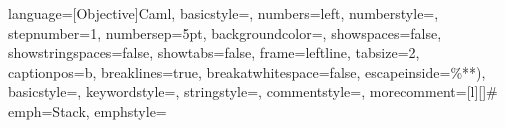         \usepackage[backend=bibtex]{biblatex}

\usepackage{fullpage}
\usepackage[english]{babel}
\usepackage[utf8]{inputenc}
\usepackage[T1]{fontenc}
\usepackage{lmodern}
\usepackage[onelanguage,boxed]{algorithm2e}
\usepackage{graphicx}
\usepackage{float}
\usepackage{amsmath}
\usepackage{amsfonts}
\usepackage{amsthm}
\usepackage{color}
\usepackage[usenames,dvipsnames]{xcolor}
\usepackage[toc,page]{appendix}
\usepackage{listings}
\usepackage{tikz}
\usepackage{subfigure}
\usepackage{wrapfig}
\usepackage{hyperref}
\hypersetup{colorlinks,linkcolor=black,urlcolor=blue}
\usepackage[font=small,labelfont=bf]{caption}
\newtheorem {myDef} {Definition}
\newtheorem {myTh}{Theorem}
\lstset
{
  language=[Objective]Caml,
  basicstyle=\footnotesize,       %
  numbers=left,                   %
  numberstyle=\footnotesize,      %
  stepnumber=1,                   %
  numbersep=5pt,                  %
  backgroundcolor=\color{white},  %
  showspaces=false,               %
  showstringspaces=false,         %
  showtabs=false,                 %
  frame=leftline,           %
  tabsize=2,          %
  captionpos=b,           %
  breaklines=true,        %
  breakatwhitespace=false,    %
  escapeinside={\%*}{*)},          %
  basicstyle=\ttfamily,
  keywordstyle=\color{BurntOrange}\ttfamily,
  stringstyle=\color{red}\ttfamily,
  commentstyle=\color{LimeGreen}\ttfamily,
  morecomment=[l][\color{RoyalBlue}]{\#}
}
\lstset
{
  emph={Stack},
  emphstyle={\color{DarkOrchid}}
}



